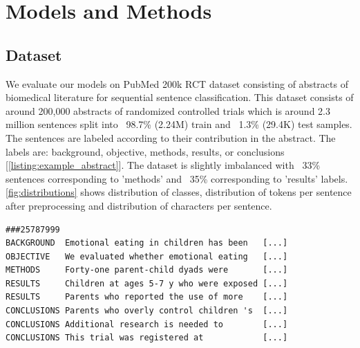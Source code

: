 \section{Models and Methods}
\label{sec:models_and_methods}
\subsection{Dataset}

We evaluate our models on PubMed 200k RCT dataset \citep{dernoncourt2017pubmed} consisting of abstracts of biomedical literature for sequential sentence classification. This dataset consists of around 200,000 abstracts of randomized controlled trials which is around 2.3 million sentences split into ~98.7\% (2.24M) train and ~1.3\% (29.4K) test samples. The sentences are labeled according to their contribution in the abstract. The labels are: background, objective, methods, results, or conclusions [\autoref{listing:example_abstract}]. The dataset is slightly imbalanced with ~33\% sentences corresponding to 'methods' and ~35\% corresponding to 'results' labels. \autoref{fig:distributions} shows distribution of classes, distribution of tokens per sentence after preprocessing and distribution of characters per sentence.\\


\begin{lstlisting}[frame=single, backgroundcolor=\color{light-gray}, basicstyle=\footnotesize\ttfamily,caption= {Example of one abstract from the PubMed 200k RCT dataset. Listing is inspired by \citet{dernoncourt2017pubmed}.},captionpos=b,label={listing:example_abstract}]
###25787999
BACKGROUND  Emotional eating in children has been   [...]
OBJECTIVE   We evaluated whether emotional eating   [...]
METHODS     Forty-one parent-child dyads were       [...]
RESULTS     Children at ages 5-7 y who were exposed [...]
RESULTS     Parents who reported the use of more    [...]
CONCLUSIONS Parents who overly control children 's  [...]
CONCLUSIONS Additional research is needed to        [...]
CONCLUSIONS This trial was registered at            [...]
\end{lstlisting}


